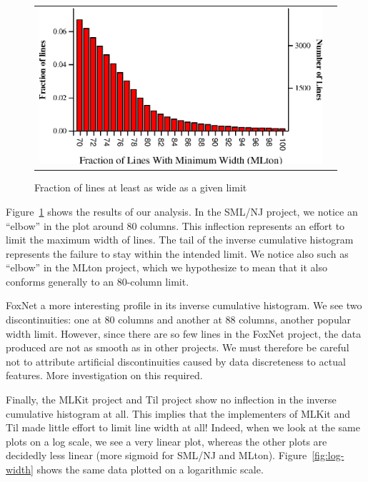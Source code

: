 \documentclass[12pt,abstracton]{scrartcl}
\begin{document}
\begin{figure}[h!]
\begin{tabular}{cc}
\includegraphics[scale=0.68]{mlton.eps} &
\end{tabular}
\caption{Fraction of lines at least as wide as a given limit}
\label{fig:width}
\end{figure}

Figure~\ref{fig:width} shows the results of our analysis. In the SML/NJ project,
we notice an ``elbow'' in the plot around 80 columns. This inflection represents
an effort to limit the maximum width of lines. The tail of the inverse cumulative
histogram represents the failure to stay within the intended limit. We notice
also such as ``elbow'' in the MLton project, which we hypothesize
to mean that it also conforms generally to an 80-column limit.

FoxNet a more interesting profile in its inverse cumulative histogram. We see
two discontinuities: one at 80 columns and another at 88 columns, another popular width limit.
However, since there are so few lines in the FoxNet project, the data produced are
not as smooth as in other projects. We must therefore be careful not to attribute
artificial discontinuities caused by data discreteness to actual features. More
investigation on this required.

Finally, the MLKit project and Til project show no inflection in the
inverse cumulative histogram at all. This implies that the implementers of MLKit
and Til made little effort to limit line width at all! Indeed, when we
look at the same plots on a log scale, we see a very linear plot,
whereas the other plots are decidedly less linear (more sigmoid for SML/NJ and MLton).
Figure~\ref{fig:log-width} shows the same data plotted on a logarithmic scale.
\end{document}
